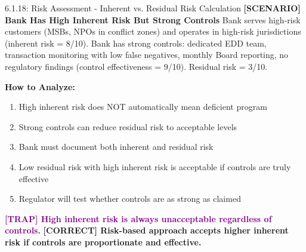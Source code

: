\documentclass[11pt,a4paper]{beamer}
\newcommand{\trap}[1]{\textcolor{purple}{\textbf{[TRAP] #1}}}
\newcommand{\correct}[1]{\textcolor{green!50!black}{\textbf{[CORRECT] #1}}}
\newcommand{\scenario}[1]{\textcolor{blue!70!black}{\textbf{[SCENARIO] #1}}}
\begin{document}
\begin{frame}{6.1.18: Risk Assessment - Inherent vs. Residual Risk Calculation}
	\scenario{Bank Has High Inherent Risk But Strong Controls}
	Bank serves high-risk customers (MSBs, NPOs in conflict zones) and operates in high-risk jurisdictions (inherent risk = 8/10). Bank has strong controls: dedicated EDD team, transaction monitoring with low false negatives, monthly Board reporting, no regulatory findings (control effectiveness = 9/10). Residual risk = 3/10.
	
	\vspace{0.1cm}
	\textbf{How to Analyze:}
	\begin{enumerate}
		\item High inherent risk does NOT automatically mean deficient program
		\item Strong controls can reduce residual risk to acceptable levels
		\item Bank must document both inherent and residual risk
		\item Low residual risk with high inherent risk is acceptable if controls are truly effective
		\item Regulator will test whether controls are as strong as claimed
	\end{enumerate}
	\trap{High inherent risk is always unacceptable regardless of controls.}
	\correct{Risk-based approach accepts higher inherent risk if controls are proportionate and effective.}
\end{frame}

\end{document}
